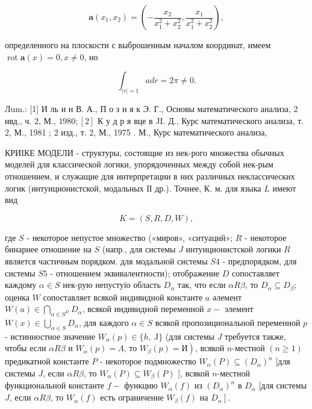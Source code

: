 \documentclass[10pt]{article}
\begin{document}
\[

\boldsymbol{a}\left(x_{1}, x_{2}\right)=\left(-\frac{x_{2}}{x_{1}^{2}+x_{2}^{2}}, \frac{x_{1}}{x_{1}^{2}+x_{2}^{2}}\right),

\]



определенного на плоскости с выброшенным началом координат, имеем $\operatorname{rot} \boldsymbol{a}(x)=0, x \neq 0$, но



\[

\int_{|r|=1} a d r=2 \pi \neq 0 .

\]



Лum.: [1] И ль и н В. А., П о з н я к Э. Г., Основы математического анализа, 2 ивд., ч. 2, М., $1980 ;[2]$ К у д р я вце в JI. Д., Курс математического анализа, т. 2, М., 1981 ; 2 изд., т. 2, М., 1975 . М., Курс математического анализа,



КРИІКЕ МОДЕЛИ - структуры, состоящие из нек-рого множества обычных моделей для классической логики, упорядоченных между собой нек-рым отношением, и служащие для интерпретации в них различных неклассических логик (интуиционистской, модальных ІІ др.). Точнее, К. м. для языка $L$ имеют вид



\[

K=(S, R, D, W),

\]



где $S$ - некоторое непустое множество («миров», «ситуаций»; $R$ - некоторое бинарнее отношение на $S$ (напр., для системы $J$ интуиционистской логики $R$ является частичным порядком. для модальной системы $S 4$ - предпорядком, для системы $S 5$ - отношением эквивалентности); отображение $D$ сопоставляет каждому $\alpha \in S$ нек-рую непустуіо область $D_{\alpha}$ так, что если $\alpha R \beta$, то $D_{\alpha} \subseteq D_{\beta}$; оценка $W$ сопоставляет всякой индивидной константе $a$ әлемент $W(a) \in \bigcap_{\alpha \in S^{D}} D_{\alpha}$, всякой индивидной переменной $x-$ элемент $W(x) \in \bigcup_{\alpha \in S} D_{\alpha}$, для каждого $\alpha \in S$ всякой пропозициональной переменной $p$ - истинностное значение $W_{\alpha}(p) \in\{h, \mathrm{~J}\}$ (для системы $J$ требуется также, чтобы если $\alpha R \beta$ и $W_{\alpha}(p)=\Lambda$, то $\left.W_{\beta}(p)=И\right)$, всякой $n$-местной $(n \geqslant 1)$ предикатной константе $P$ - некоторое подмножество $W_{\alpha}(P) \subseteq\left(D_{\alpha}\right)^{n}$ [для системы $J$, если $\alpha R \beta$, то $W_{\alpha}(P) \subseteq W_{\beta}(P)$ ], всякой $n$-местной функциональной константе $f-$ функцию $W_{\alpha}(f)$ из $\left(D_{\alpha}\right)^{n}$ в $D_{\alpha}$ [для системы $J$, если $\alpha R \beta$, то $W_{\alpha}(f)$ есть ограничение $W_{\beta}(f)$ на $\left.D_{\alpha}\right]$.
\end{document}
